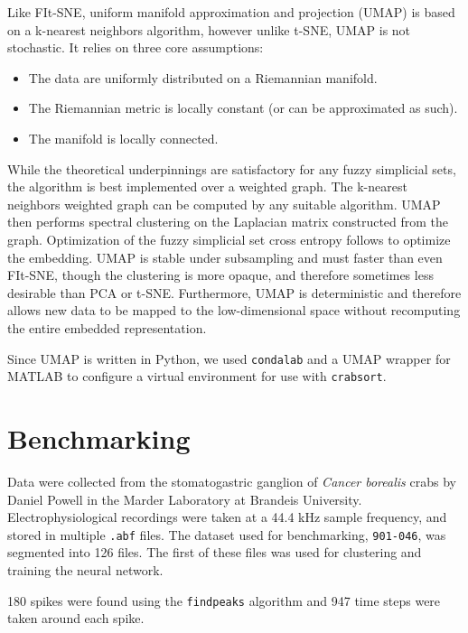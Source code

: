 \documentclass{article}
\begin{document}
Like FIt-SNE, uniform manifold approximation and projection (UMAP) \autocite{mcinnesUMAPUniformManifold2018}
is based on a k-nearest neighbors algorithm, however unlike t-SNE, UMAP is not stochastic.
It relies on three core assumptions:

\begin{itemize}
  \item The data are uniformly distributed on a Riemannian manifold.
  \item The Riemannian metric is locally constant (or can be approximated as such).
  \item The manifold is locally connected.
\end{itemize}

While the theoretical underpinnings are satisfactory for any fuzzy simplicial sets,
the algorithm is best implemented over a weighted graph.
The k-nearest neighbors weighted graph can be computed by any suitable algorithm.
UMAP then performs spectral clustering on the Laplacian matrix constructed from the graph.
Optimization of the fuzzy simplicial set cross entropy follows to optimize the embedding.
UMAP is stable under subsampling and must faster than even FIt-SNE,
though the clustering is more opaque, and therefore sometimes less desirable than PCA or t-SNE.
Furthermore, UMAP is deterministic and therefore allows new data to be mapped to the low-dimensional space
without recomputing the entire embedded representation.

Since UMAP is written in Python, we used \texttt{condalab} and a UMAP wrapper for MATLAB
to configure a virtual environment for use with \texttt{crabsort}.

\section{Benchmarking}

Data were collected from the stomatogastric ganglion of \textit{Cancer borealis} crabs
by Daniel Powell in the Marder Laboratory at Brandeis University.
Electrophysiological recordings were taken at a 44.4 kHz sample frequency,
and stored in multiple \texttt{.abf} files.
The dataset used for benchmarking, \texttt{901-046}, was segmented into 126 files.
The first of these files was used for clustering and training the neural network.

180 spikes were found using the \texttt{findpeaks} algorithm
and 947 time steps were taken around each spike.
\end{document}
